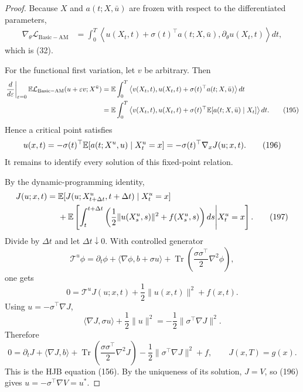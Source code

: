 \begin{proof}
Because $X$ and $a(t;X,\bar u)$ are frozen with respect to the differentiated parameters,
\begin{align*}
 \nabla_\theta\mathcal L_{\mathrm{Basic-AM}}
 &=\int_0^T
 \left\langle
 u(X_t,t)+\sigma(t)^\top a(t;X,\bar u),
 \partial_\theta u(X_t,t)
 \right\rangle dt,
 \tag{193--194}
\end{align*}
which is (32).

For the functional first variation, let $v$ be arbitrary.  Then
\begin{align*}
 \left.\frac d{d\varepsilon}\right|_{\varepsilon=0}
 \mathbb{E}\mathcal L_{\mathrm{Basic-AM}}(u+\varepsilon v;X^{\bar u})
 &=\mathbb{E}\int_0^T
 \left\langle
 v(X_t,t),u(X_t,t)+\sigma(t)^\top a(t;X,\bar u)
 \right\rangle dt\\
 &=\mathbb{E}\int_0^T
 \left\langle
 v(X_t,t),u(X_t,t)+\sigma(t)^\top
 \mathbb{E}[a(t;X,\bar u)\mid X_t]
 \right\rangle dt.
 \tag{195}
\end{align*}
Hence a critical point satisfies
\begin{equation*}
 u(x,t)=-\sigma(t)^\top\mathbb{E}[a(t;X^u,u)\mid X_t^u=x]
 =-\sigma(t)^\top\nabla_xJ(u;x,t).
 \tag{196}
\end{equation*}
It remains to identify every solution of this fixed-point relation.

By the dynamic-programming identity,
\begin{align*}
 J(u;x,t)
 ={}&\mathbb{E}[J(u;X_{t+\Delta t}^u,t+\Delta t)\mid X_t^u=x]\\
 &+\mathbb{E}\left[
 \int_t^{t+\Delta t}
 \left(\frac12\|u(X_s^u,s)\|^2+f(X_s^u,s)\right)ds
 \middle|X_t^u=x
 \right].
 \tag{197}
\end{align*}
Divide by $\Delta t$ and let $\Delta t\downarrow0$.  With controlled generator
\begin{equation*}
 \mathcal T^u\phi
 =\partial_t\phi+\langle\nabla\phi,b+\sigma u\rangle
 +\operatorname{Tr}\left(\frac{\sigma\sigma^\top}{2}\nabla^2\phi\right),
 \tag{199}
\end{equation*}
one gets
\begin{equation*}
 0=\mathcal T^uJ(u;x,t)+\frac12\|u(x,t)\|^2+f(x,t).
 \tag{200}
\end{equation*}
Using $u=-\sigma^\top\nabla J$,
\begin{equation*}
 \langle\nabla J,\sigma u\rangle+\frac12\|u\|^2
 =-\frac12\|\sigma^\top\nabla J\|^2.
 \tag{201}
\end{equation*}
Therefore
\begin{equation*}
 0=\partial_tJ+\langle\nabla J,b\rangle
 +\operatorname{Tr}\left(\frac{\sigma\sigma^\top}{2}\nabla^2J\right)
 -\frac12\|\sigma^\top\nabla J\|^2+f,
 \qquad J(x,T)=g(x).
 \tag{202}
\end{equation*}
This is the HJB equation (156).  By the uniqueness of its solution, $J=V$, so (196) gives
$u=-\sigma^\top\nabla V=u^*$.
\end{proof}

